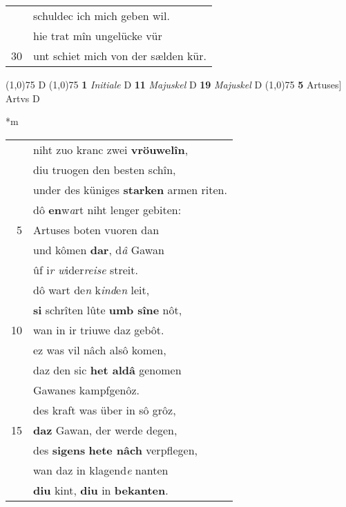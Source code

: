 \documentclass[8pt,a4paper,notitlepage]{article}
\begin{document}
\begin{table}[ht]
\begin{minipage}[t]{0.5\linewidth}
\begin{tabular}{rl}
 & schuldec ich mich geben wil.\\ 
 & hie trat mîn ungelücke vür\\ 
30 & unt schiet mich von der sælden kür.\\ 
\end{tabular}
\scriptsize
\line(1,0){75} \newline
D \newline
\line(1,0){75} \newline
\textbf{1} \textit{Initiale} D  \textbf{11} \textit{Majuskel} D  \textbf{19} \textit{Majuskel} D  \newline
\line(1,0){75} \newline
\textbf{5} Artuses] Artvs D \newline
\end{minipage}
\hspace{0.5cm}
\begin{minipage}[t]{0.5\linewidth}
\small
\begin{center}*m
\end{center}
\begin{tabular}{rl}
 & niht zuo kranc zwei \textbf{vröuwelîn},\\ 
 & diu truogen den besten schîn,\\ 
 & under des küniges \textbf{starken} armen riten.\\ 
 & dô \textbf{en}w\textit{a}rt niht lenger gebiten:\\ 
5 & Artuses boten vuoren dan\\ 
 & und kômen \textbf{dar}, d\textit{â} Gawan\\ 
 & ûf i\textit{r w}ider\textit{reise} streit.\\ 
 & dô wart de\textit{n} k\textit{ind}e\textit{n} leit,\\ 
 & \textbf{si} schrîten lûte \textbf{umb sîne} nôt,\\ 
10 & wan in ir triuwe daz gebôt.\\ 
 & ez was vil nâch alsô komen,\\ 
 & daz den sic \textbf{het aldâ} genomen\\ 
 & Gawanes kampfgenôz.\\ 
 & des kraft was über in sô grôz,\\ 
15 & \textbf{daz} Gawan, der werde degen,\\ 
 & des \textbf{sigens} \textbf{hete nâch} verpflegen,\\ 
 & wan daz in klagend\textit{e} nanten\\ 
 & \textbf{diu} kint, \textbf{diu} in \textbf{bekanten}.\\ 

\end{tabular}
\end{minipage}
\end{table}
\end{document}
